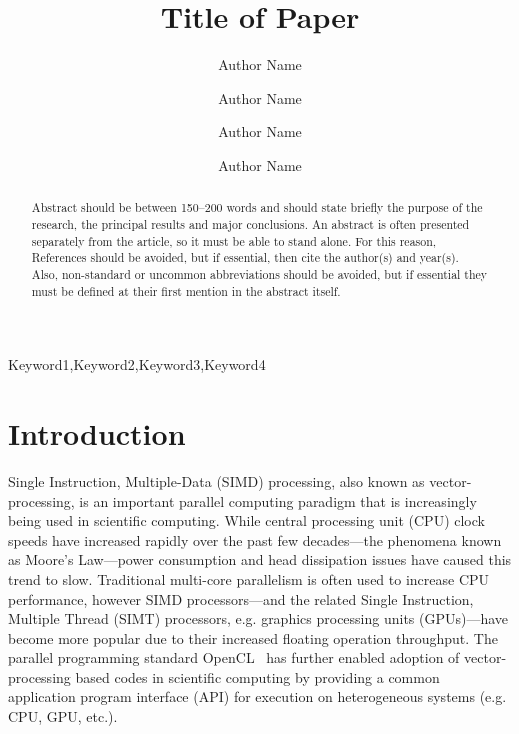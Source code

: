 \documentclass[12pt]{ussci}
\title{ Title of Paper }
\author[1]{Author Name}
\author[1]{Author Name}
\author[2]{Author Name}
\author[2,*]{Author Name}
\affil[1]{Department, Institution, Address, Country}
\affil[2]{Department, Institution, Address, Country}
\affil[*]{Corresponding author: \email{author@university.edu}}
\begin{document}
\maketitle

\begin{abstract} %
Abstract should be between 150--200 words and should state briefly the purpose
of the research, the principal results and major conclusions. An abstract is
often presented separately from the article, so it must be able to stand alone.
For this reason, References should be avoided, but if essential, then cite the
author(s) and year(s). Also, non-standard or uncommon abbreviations should be
avoided, but if essential they must be defined at their first mention in the
abstract itself.
\end{abstract}

\begin{keyword}
    Keyword1\sep Keyword2\sep Keyword3\sep Keyword4
\end{keyword}

\section{Introduction}
%

Single Instruction, Multiple-Data (SIMD) processing, also known as vector-processing, is an important parallel computing paradigm that is increasingly being used in scientific computing.
While central processing unit (CPU) clock speeds have increased rapidly over the past few decades---the phenomena known as Moore's Law---power consumption and head dissipation issues have caused this trend to slow.
Traditional multi-core parallelism is often used to increase CPU performance, however SIMD processors---and the related Single Instruction, Multiple Thread (SIMT) processors, e.g. graphics processing units (GPUs)---have become more popular due to their increased floating operation throughput.
The parallel programming standard OpenCL~\cite{stone2010openc} has further enabled adoption of vector-processing based codes in scientific computing by providing a common application program interface (API) for execution on heterogeneous systems (e.g. CPU, GPU, etc.).
\end{document}

